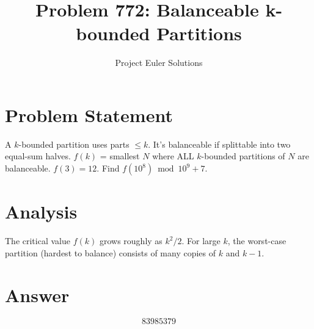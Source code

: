 \documentclass[11pt]{article}
\title{Problem 772: Balanceable k-bounded Partitions}
\author{Project Euler Solutions}
\date{}
\begin{document}
\maketitle


\section{Problem Statement}
A $k$-bounded partition uses parts $\le k$. It's balanceable if splittable into two equal-sum halves. $f(k)$ = smallest $N$ where ALL $k$-bounded partitions of $N$ are balanceable. $f(3)=12$. Find $f(10^8) \bmod 10^9+7$.

\section{Analysis}
The critical value $f(k)$ grows roughly as $k^2/2$. For large $k$, the worst-case partition (hardest to balance) consists of many copies of $k$ and $k-1$.

\section{Answer}

\[
\boxed{83985379}
\]
\end{document}
